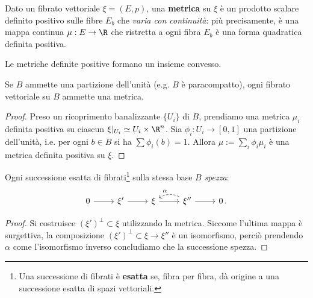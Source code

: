 



\begin{df}
	Dato un fibrato vettoriale $\xi = (E,p)$,
	una \textbf{metrica} su $\xi$ è un prodotto scalare definito positivo
	sulle fibre $E_{b}$ che \emph{varia con continuità}: più precisamente,
	è una mappa continua $\mu:E \to \R$ che ristretta a ogni fibra
	$E_{b}$ è una forma quadratica definita positiva.
\end{df}

\begin{oss}
	Le metriche definite positive formano un insieme convesso.
\end{oss}


\begin{prop}
	Se $B$ ammette una partizione dell'unità (e.g. $B$ è paracompatto),
	ogni fibrato vettoriale su $B$ ammette una metrica.
	\begin{proof}
		Preso un ricoprimento banalizzante $\{U_{i}\}$ di $B$,
prendiamo una metrica $\mu_{i}$ definita positiva
su ciascun $\xi\vert_{U_{i}} \simeq U_{i} \times \R^{n}$.
Sia $\phi_{i}:U_{i}\to [0,1]$ una partizione dell'unità, i.e.
per ogni $b \in B$ si ha $\sum \phi_{i}(b) = 1$.
Allora $\mu := \sum_{i} \phi_{i}\mu_{i}$ è una metrica definita positiva su $\xi$.
	\end{proof}
\end{prop}	


\begin{cor}
	Ogni successione esatta di fibrati\footnote{Una successione di fibrati è \textbf{esatta} se, fibra per fibra, dà origine a una successione esatta di spazi vettoriali.} sulla stessa base $B$  \emph{spezza}:
	\begin{equation*}
		\begin{tikzcd}
			0 \ar[r]
			& \xi' \ar[r]
			& \xi \ar[r]
			& \xi'' \ar[r] \ar[l, bend right, dashed, "\alpha"']
			& 0\,.
		\end{tikzcd}
	\end{equation*}
	\begin{proof}
		Si costruisce $(\xi')^{\perp} \subset \xi$ utilizzando la metrica.
		Siccome l'ultima mappa è surgettiva, la composizione
		$(\xi')^{\perp} \subset \xi \to \xi''$ è un isomorfismo,
		perciò prendendo $\alpha$ come l'isomorfismo inverso
		concludiamo che la successione spezza.
	\end{proof}
\end{cor}

